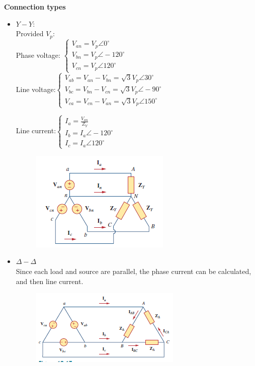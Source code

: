 \documentclass[10pt,landscape]{article}
\theoremstyle{definition}
\theoremstyle{remark}
\begin{document}
\begin{multicols}{3}
\textbf{Connection types}
\begin{itemize}[noitemsep,nolistsep]
    \item $Y - Y$: \\
    Provided $V_p$: \\
    Phase voltage: $
    \begin{cases}
    V_{an} = V_p \angle 0^{\circ} \\
    V_{bn} = V_p \angle -120^{\circ} \\
    V_{cn} = V_p \angle 120^{\circ}   
    \end{cases}
    $\\
    
    Line voltage:$
    \begin{cases}
    V_{ab} = V_{an} - V_{bn} = \sqrt{3} V_p \angle 30^{\circ} \\
    V_{bc} = V_{bn} - V_{cn} = \sqrt{3} V_p \angle -90^{\circ} \\
    V_{ca} = V_{cn} - V_{an} = \sqrt{3} V_p \angle 150^{\circ} 
    \end{cases}
    $
    
    Line current:$
    \begin{cases}
    I_{a} = \frac{V_{an}}{Z_Y} \\
    I_{b} =I_a \angle -120^{\circ} \\
    I_{c} = I_a \angle 120^{\circ}
    \end{cases}
    $
    

\begin{figure}[H]
    \centering
    \includegraphics[width=0.5\linewidth]{202/figure/y-y.png}
    \caption{}
    \label{fig:y-y}
\end{figure}

    \item $\Delta - \Delta$ \\
Since each load and source are parallel, the phase current can be calculated, and then line current.
    
\begin{figure}[H]
    \centering
    \includegraphics[width=0.5\linewidth]{202/figure/d-d.png}
    \caption{}
    \label{fig:d-d}
\end{figure}


\end{itemize}
\end{multicols}
\end{document}
